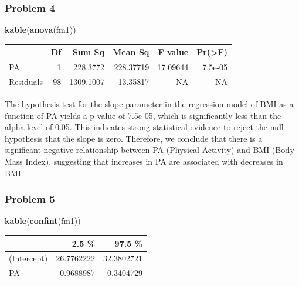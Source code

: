 \documentclass[
]{article}
\newenvironment{Shaded}{\begin{snugshade}}{\end{snugshade}}
\newcommand{\FunctionTok}[1]{\textcolor[rgb]{0.13,0.29,0.53}{\textbf{#1}}}
\newcommand{\NormalTok}[1]{#1}
\begin{document}
\hypertarget{problem-4}{%
\subsubsection{Problem 4}\label{problem-4}}

\begin{Shaded}
\begin{Highlighting}[]
\FunctionTok{kable}\NormalTok{(}\FunctionTok{anova}\NormalTok{(fm1))}
\end{Highlighting}
\end{Shaded}

\begin{longtable}[]{@{}lrrrrr@{}}
\toprule\noalign{}
& Df & Sum Sq & Mean Sq & F value & Pr(\textgreater F) \\
\midrule\noalign{}
\endhead
\bottomrule\noalign{}
\endlastfoot
PA & 1 & 228.3772 & 228.37719 & 17.09644 & 7.5e-05 \\
Residuals & 98 & 1309.1007 & 13.35817 & NA & NA \\
\end{longtable}

The hypothesis test for the slope parameter in the regression model of
BMI as a function of PA yields a p-value of 7.5e-05, which is
significantly less than the alpha level of 0.05. This indicates strong
statistical evidence to reject the null hypothesis that the slope is
zero. Therefore, we conclude that there is a significant negative
relationship between PA (Physical Activity) and BMI (Body Mass Index),
suggesting that increases in PA are associated with decreases in BMI.

\hypertarget{problem-5}{%
\subsubsection{Problem 5}\label{problem-5}}

\begin{Shaded}
\begin{Highlighting}[]
\FunctionTok{kable}\NormalTok{(}\FunctionTok{confint}\NormalTok{(fm1))}
\end{Highlighting}
\end{Shaded}

\begin{longtable}[]{@{}lrr@{}}
\toprule\noalign{}
& 2.5 \% & 97.5 \% \\
\midrule\noalign{}
\endhead
\bottomrule\noalign{}
\endlastfoot
(Intercept) & 26.7762222 & 32.3802721 \\
PA & -0.9688987 & -0.3404729 \\
\end{longtable}
\end{document}
